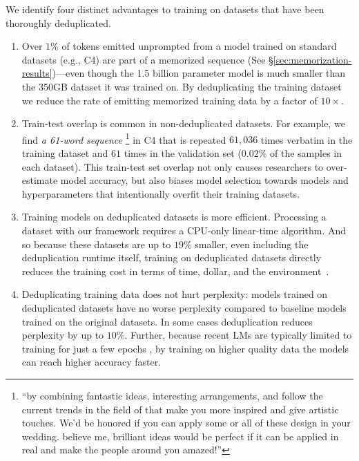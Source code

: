 We identify four distinct advantages to training on datasets that have been thoroughly deduplicated.
\begin{enumerate}

\item 
Over $1\%$ of tokens emitted unprompted from a model trained on standard datasets (e.g., C4) are part of a memorized sequence (See \S\ref{sec:memorization-results})---even though the 1.5 billion parameter model is much smaller than the 350GB dataset it was trained on.
By deduplicating the training dataset we reduce the rate of emitting memorized training data by a factor of $10\times$.

\item Train-test overlap is common in non-deduplicated datasets.
For example, we find \emph{a 61-word sequence}%
\footnote{``by combining fantastic ideas, interesting arrangements, and follow the current trends in the field of that make you more inspired and give artistic touches. We'd be honored if you can apply some or all of these design in your wedding. believe me, brilliant ideas would be perfect if it can be applied in real and make the people around you amazed!''} 
in C4 \citep{raffel2019exploring} that is repeated $61{,}036$ times verbatim in the training dataset and $61$ times in the validation set ($0.02\%$ of the samples in each dataset).
This train-test set overlap not only causes researchers to over-estimate model accuracy, but also biases model selection towards models and hyperparameters that intentionally overfit their training datasets.

\item Training models on deduplicated datasets is more efficient.
Processing a dataset with our framework requires a CPU-only linear-time algorithm.
And so because 
these datasets are up to $19\%$ smaller, even including the deduplication runtime itself, training on deduplicated datasets directly reduces the training cost in terms of time, dollar, and the environment~\cite{bender2021stochastic, strubell2019energy, patterson2021carbon}.


\item Deduplicating training data does not hurt perplexity: models trained on deduplicated datasets have no worse perplexity compared to baseline models trained on the original datasets. 
In some cases deduplication reduces perplexity by up to $10\%$.
Further, because recent LMs are typically limited to training for just a few epochs \cite{radford2019language,raffel2019exploring},
by training on higher quality data the models can reach higher accuracy faster.
\end{enumerate}
